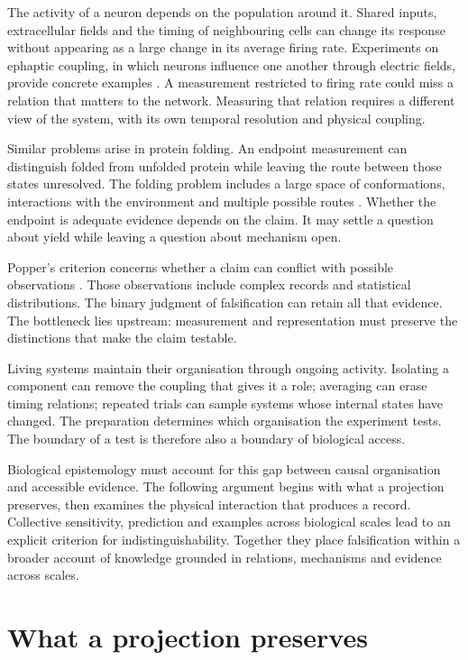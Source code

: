 \documentclass[10pt,twocolumn]{article}
\begin{document}
The activity of a neuron depends on the population around it. Shared inputs, extracellular fields and the timing of neighbouring cells can change its response without appearing as a large change in its average firing rate. Experiments on ephaptic coupling, in which neurons influence one another through electric fields, provide concrete examples \citep{anastassiou2011,chiang2019}. A measurement restricted to firing rate could miss a relation that matters to the network. Measuring that relation requires a different view of the system, with its own temporal resolution and physical coupling.

Similar problems arise in protein folding. An endpoint measurement can distinguish folded from unfolded protein while leaving the route between those states unresolved. The folding problem includes a large space of conformations, interactions with the environment and multiple possible routes \citep{dill2012}. Whether the endpoint is adequate evidence depends on the claim. It may settle a question about yield while leaving a question about mechanism open.

Popper's criterion concerns whether a claim can conflict with possible observations \citep{popper1959}. Those observations include complex records and statistical distributions. The binary judgment of falsification can retain all that evidence. The bottleneck lies upstream: measurement and representation must preserve the distinctions that make the claim testable.

Living systems maintain their organisation through ongoing activity. Isolating a component can remove the coupling that gives it a role; averaging can erase timing relations; repeated trials can sample systems whose internal states have changed. The preparation determines which organisation the experiment tests. The boundary of a test is therefore also a boundary of biological access.

Biological epistemology must account for this gap between causal organisation and accessible evidence. The following argument begins with what a projection preserves, then examines the physical interaction that produces a record. Collective sensitivity, prediction and examples across biological scales lead to an explicit criterion for indistinguishability. Together they place falsification within a broader account of knowledge grounded in relations, mechanisms and evidence across scales.

\section{What a projection preserves}
\label{sec:projection}
\end{document}
